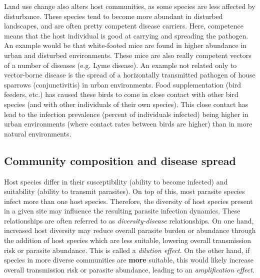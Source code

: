\documentclass[12pt]{article}
\begin{document}
Land use change also alters host communities, as some species are less affected by disturbance. These species tend to become more abundant in disturbed landscapes, and are often pretty competent disease carriers. Here, competence means that the host individual is good at carrying and spreading the pathogen. An example would be that white-footed mice are found in higher abundance in urban and disturbed environments. These mice are also really competent vectors of a number of diseases (e.g. Lyme disease). An example not related only to vector-borne disease is the spread of a horizontally transmitted pathogen of house sparrows (conjunctivitis) in urban environments. Food supplementation (bird feeders, etc.) has caused these birds to come in close contact with other bird species (and with other individuals of their own species). This close contact has lead to the infection prevalence (percent of individuals infected) being higher in urban environments (where contact rates between birds are higher) than in more natural environments. 


















\bigskip
\subsection*{Community composition and disease spread}

Host species differ in their susceptibility (ability to become infected) and suitability (ability to transmit parasites). On top of this, most parasite species infect more than one host species. Therefore, the diversity of host species present in a given site may influence the resulting parasite infection dynamics. These relationships are often referred to as \textit{diversity-disease} relationships. On one hand, increased host diversity may reduce overall parasite burden or abundance through the addition of host species which are less suitable, lowering overall transmission risk or parasite abundance. This is called a \textit{dilution effect}. On the other hand, if species in more diverse communities are \textbf{more} suitable, this would likely increase overall transmission risk or parasite abundance, leading to an \textit{amplification effect}. \\
\end{document}
